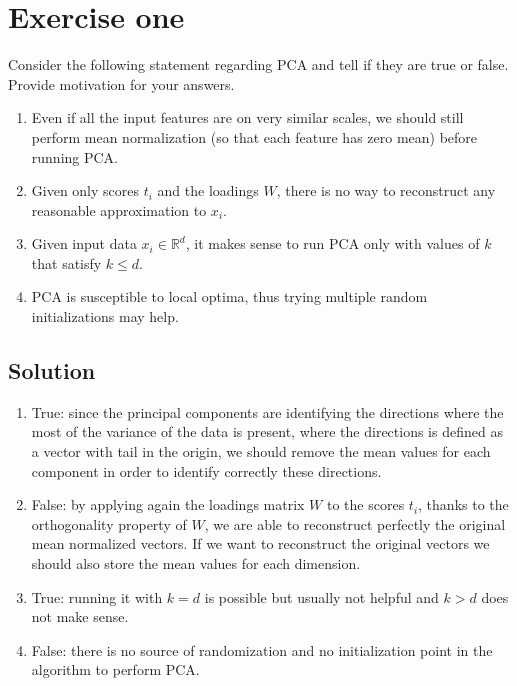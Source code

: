 \section{Exercise one}

Consider the following statement regarding PCA and tell if they are true or false. Provide motivation for your answers.
\begin{enumerate}
    \item Even if all the input features are on very similar scales, we should still perform mean normalization (so that each feature has zero mean) before running PCA.
    \item Given only scores $t_i$ and the loadings $W$, there is no way to reconstruct any reasonable approximation to $x_i$. 
    \item Given input data $x_i\in\mathbb{R}^d$, it makes sense to run PCA only with values of $k$ that satisfy $k \leq d$.
    \item PCA is susceptible to local optima, thus trying multiple random initializations may help.
\end{enumerate}

\subsection*{Solution}
\begin{enumerate}
    \item True: since the principal components are identifying the directions where the most of the variance of the data is present, where the directions is defined as a vector with tail in the origin, we should remove the mean values for each component in order to identify correctly these directions.
    \item False: by applying again the loadings matrix $W$ to the scores $t_i$, thanks to the orthogonality property of $W$, we are able to reconstruct perfectly the original mean normalized vectors. 
        If we want to reconstruct the original vectors we should also store the mean values for each dimension.
    \item True: running it with $k = d$ is possible but usually not helpful and $k > d$ does not make sense.
    \item False: there is no source of randomization and no initialization point in the algorithm to perform PCA.
\end{enumerate}